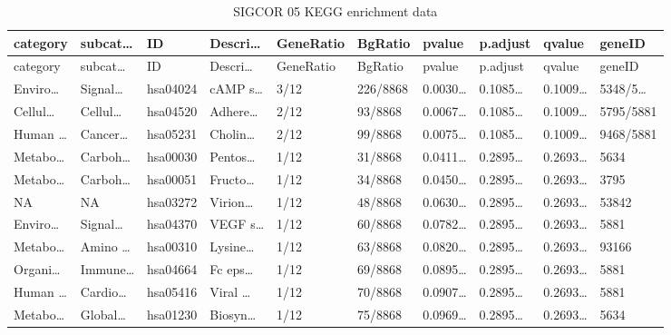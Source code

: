 \documentclass[
]{article}
\begin{document}
\begin{center}\vspace{1.5cm}\end{center}

\begin{center}\vspace{1.5cm}\end{center}

\begin{longtable}[]{@{}llllllllll@{}}
\caption{\label{tab:SIGCOR-05-KEGG-enrichment-data}SIGCOR 05 KEGG enrichment data}\tabularnewline
\toprule
category & subcat\ldots{} & ID & Descri\ldots{} & GeneRatio & BgRatio & pvalue & p.adjust & qvalue & geneID\tabularnewline
\midrule
\endfirsthead
\toprule
category & subcat\ldots{} & ID & Descri\ldots{} & GeneRatio & BgRatio & pvalue & p.adjust & qvalue & geneID\tabularnewline
\midrule
\endhead
Enviro\ldots{} & Signal\ldots{} & hsa04024 & cAMP s\ldots{} & 3/12 & 226/8868 & 0.0030\ldots{} & 0.1085\ldots{} & 0.1009\ldots{} & 5348/5\ldots{}\tabularnewline
Cellul\ldots{} & Cellul\ldots{} & hsa04520 & Adhere\ldots{} & 2/12 & 93/8868 & 0.0067\ldots{} & 0.1085\ldots{} & 0.1009\ldots{} & 5795/5881\tabularnewline
Human \ldots{} & Cancer\ldots{} & hsa05231 & Cholin\ldots{} & 2/12 & 99/8868 & 0.0075\ldots{} & 0.1085\ldots{} & 0.1009\ldots{} & 9468/5881\tabularnewline
Metabo\ldots{} & Carboh\ldots{} & hsa00030 & Pentos\ldots{} & 1/12 & 31/8868 & 0.0411\ldots{} & 0.2895\ldots{} & 0.2693\ldots{} & 5634\tabularnewline
Metabo\ldots{} & Carboh\ldots{} & hsa00051 & Fructo\ldots{} & 1/12 & 34/8868 & 0.0450\ldots{} & 0.2895\ldots{} & 0.2693\ldots{} & 3795\tabularnewline
NA & NA & hsa03272 & Virion\ldots{} & 1/12 & 48/8868 & 0.0630\ldots{} & 0.2895\ldots{} & 0.2693\ldots{} & 53842\tabularnewline
Enviro\ldots{} & Signal\ldots{} & hsa04370 & VEGF s\ldots{} & 1/12 & 60/8868 & 0.0782\ldots{} & 0.2895\ldots{} & 0.2693\ldots{} & 5881\tabularnewline
Metabo\ldots{} & Amino \ldots{} & hsa00310 & Lysine\ldots{} & 1/12 & 63/8868 & 0.0820\ldots{} & 0.2895\ldots{} & 0.2693\ldots{} & 93166\tabularnewline
Organi\ldots{} & Immune\ldots{} & hsa04664 & Fc eps\ldots{} & 1/12 & 69/8868 & 0.0895\ldots{} & 0.2895\ldots{} & 0.2693\ldots{} & 5881\tabularnewline
Human \ldots{} & Cardio\ldots{} & hsa05416 & Viral \ldots{} & 1/12 & 70/8868 & 0.0907\ldots{} & 0.2895\ldots{} & 0.2693\ldots{} & 5881\tabularnewline
Metabo\ldots{} & Global\ldots{} & hsa01230 & Biosyn\ldots{} & 1/12 & 75/8868 & 0.0969\ldots{} & 0.2895\ldots{} & 0.2693\ldots{} & 5634\tabularnewline

\end{longtable}
\end{document}
